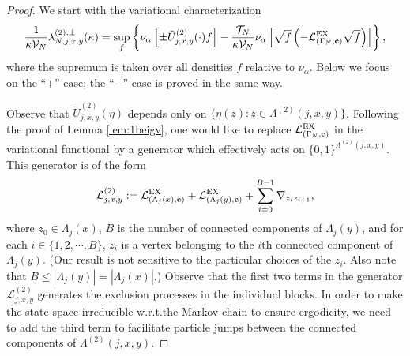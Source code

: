 \documentclass[11pt]{amsart}
\theoremstyle{plain}
\theoremstyle{definition}
\theoremstyle{remark}
\begin{document}
\begin{proof}
We start with the variational characterization
\begin{equation}
\frac{1}{\kappa \mathcal{V}_N}\lambda^{(2),\pm}_{N,j,x,y}(\kappa)=\sup_f \left\{\nu_\alpha \left[\pm{\tilde{U}^{(2)}_{{{j}},{{x}},{{y}}}}(\cdot) f\right] -  \frac{\mathcal{T}_N}{\kappa \mathcal{V}_N} \nu_\alpha \left[\sqrt{f}\left( -\mathcal{L}^{\rm EX}_{(\Gamma_N,{\bf c})} \sqrt{f}\right) \right] \right\},
\end{equation}
where the supremum is taken over all densities $f$ relative to $\nu_\alpha$. Below we focus on the ``$+$'' case; the ``$-$'' case is proved in the same way.

Observe that ${\tilde{U}^{(2)}_{{{j}},{{x}},{{y}}}}(\eta)$ depends only on $\{\eta(z): z\in \Lambda^{(2)}(j,x,y)\}$. Following the proof of Lemma \ref{lem:1beigv}, one would like to replace $\mathcal{L}^{\rm EX}_{(\Gamma_N,{\bf c})}$ in the variational functional by a generator which effectively acts on $\{0,1\}^{\Lambda^{(2)}(j,x,y)}$. This generator is of the form
\begin{align}
\mathcal{L}^{(2)}_{j,x,y} := \mathcal{L}^{\rm EX}_{(\Lambda_j(x), {\bf c})} + \mathcal{L}^{\rm EX}_{(\Lambda_j(y), {\bf c})} +\sum_{i=0}^{B-1} \nabla_{z_i z_{i+1}},
\end{align}
where $z_0 \in \Lambda_j(x)$, $B$ is the number of connected components of $\Lambda_j(y)$, and for each $i\in \{1,2,\cdots, B\}$, $z_i$ is a vertex belonging to the $i$th connected component of $\Lambda_j(y)$. (Our result is not sensitive to the particular choices of the $z_i$. Also note that $B\leq |\Lambda_j(y)| = |\Lambda_j(x)|$.) Observe that the first two terms in the generator $\mathcal{L}^{(2)}_{j,x,y}$ generates the exclusion processes in the individual blocks. In order to make the state space irreducible w.r.t.\@ the Markov chain to ensure ergodicity, we need to add the third term to facilitate particle jumps between the connected components of $\Lambda^{(2)}(j,x,y)$. 


\end{proof}
\end{document}
